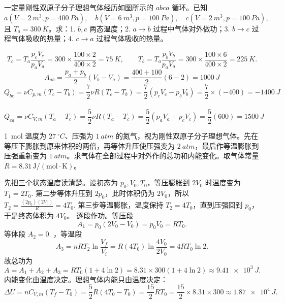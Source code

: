\begin{exercise}
一定量刚性双原子分子理想气体经历如图所示的 \(abca\) 循环。已知
 \(a( V=\SI{2}{m^3},p=\SI{400}{Pa}),\quad b( V=\SI{6}{m^3},p=\SI{100}{Pa}),\quad c( V=\SI{2}{m^3},p=\SI{100}{Pa}),\) 
且 \(T_a=\SI{300}{K}\)。求：1. \(b,c\) 两态温度；2. \(a\to b\) 过程中气体对外做功；3. \(b\to c\) 过程气体吸收的热量；4. \(c\to a\) 过程气体吸收的热量。

\begin{center}
\end{center}
\end{exercise}

\begin{solution}
 \[T_c=T_a\frac{p_cV_c}{p_aV_a} =300\times\frac{100\times2}{400\times2} =\SI{75}{K},\qquad T_b=T_a\frac{p_bV_b}{p_aV_a} =300\times\frac{100\times6}{400\times2} =\SI{225}{K}.\] 
\[A_{ab}=\frac{p_a+p_b}{2}(V_b-V_a) =\frac{400+100}{2}(6-2) =\SI{1000}{J}\]
\[Q_{bc}=\nu C_{p,m}(T_c-T_b)=\frac{7}{2}\nu R(T_c-T_b)=\frac72(p_cV_c-p_bV_b)=\frac72\times (-400)=\SI{-1400}{J}\]\
\[Q_{ca}=\nu C_{V,m}(T_a-T_c)=\frac52\nu R(T_a-T_c)=\frac52(p_aV_a-p_cV_c)=\frac52(600)=\SI{1500}{J}\]
\end{solution}

\begin{exercise}
\SI{1}{mol} 温度为 \(\SI{27}{^\circ C}\)、压强为 \(\SI{1}{atm}\) 的氮气，视为刚性双原子分子理想气体。先在等压下膨胀到原来体积的两倍，再等体升压使压强变为 \(\SI{2}{atm}\)，最后作等温膨胀到压强重新变为 \(\SI{1}{atm}\)。求气体在全部过程中对外作的总功和内能变化。取气体常量 \(R=8.31\,\mathrm{J/(mol\cdot K)}\)。
\end{exercise}

\begin{solution}
先把三个状态温度读清楚。设初态为 \(p_0,V_0,T_0\)，等压膨胀到 \(2V_0\) 时温度变为 \(T_1=2T_0.\) 
第二步等体升压到 \(2p_0\)，此时体积仍为 \(2V_0\)，所以 \(T_2=\frac{(2p_0)(2V_0)}{R}=4T_0.\) 
第三步等温膨胀，温度保持 \(T_2=4T_0\)，直到压强回到 \(p_0\)，于是终态体积为 \(4V_0\)。
逐段作功。等压段
 \[A_1=p_0(2V_0-V_0)=p_0V_0=RT_0.\]
等体段 \(A_2=0.\) ，等温段
 \[A_3=nRT_2\ln\frac{V_f}{V_i} =R(4T_0)\ln\frac{4V_0}{2V_0} =4RT_0\ln2.\]
故总功为
 \[A=A_1+A_2+A_3 =RT_0(1+4\ln2)=8.31\times300(1+4\ln2) \approx \SI{9.41e3}{J}.\]
内能变化由温度决定。理想气体内能只由温度决定：
 \[\Delta U=nC_{V,m}(T_f-T_0) =\frac52R(4T_0-T_0) =\frac{15}{2}RT_0=\frac{15}{2}\times8.31\times300 \approx \SI{1.87e4}{J}.\] 
\end{solution}
